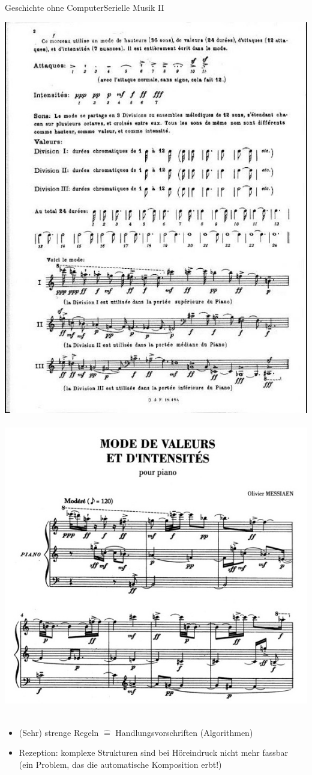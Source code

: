\begin{frame}{Geschichte ohne Computer}{Serielle Musik II}
	
	\vspace{-.8cm}
	\includegraphics[width=.32\textwidth]{img/Olivier_Messiaen_Regeln.jpg}
	\hfill\raisebox{2.5cm}{\Huge\Conclude}~\includegraphics[width=.44\textwidth]{img/Olivier_Messiaen_Score.png}~~
	
	\begin{itemize}
		\item[\conclude] (Sehr) strenge Regeln $\hat=$ Handlungsvorschriften (Algorithmen)
		\item[\Conclude] Rezeption: komplexe Strukturen sind bei Höreindruck nicht mehr fassbar\\
		\hfill {\small (ein Problem, das die automatische Komposition erbt!)}
	\end{itemize}
	
\end{frame}


